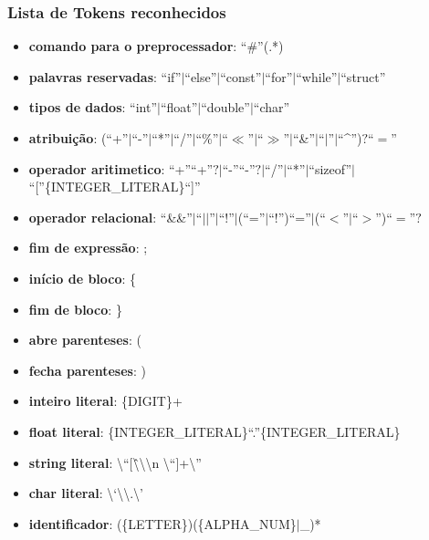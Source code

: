 \documentclass[12pt]{beamer}
\begin{document}
\begin{frame}[allowframebreaks]
    \frametitle{Lista de Tokens reconhecidos}
    \begin{itemize}
        \item\textbf{comando para o preprocessador}: ``\#''(.*)
        \item\textbf{palavras reservadas}: ``if''$|$``else''$|$``const''$|$``for''$|$``while''$|$``struct''
        \item\textbf{tipos de dados}: ``int''$|$``float''$|$``double''$|$``char''
        \item\textbf{atribuição}: (``+''$|$``-''$|$``*''$|$``/''$|$``\%''$|$``$\ll$''$|$``$\gg$''$|$``\&''$|$``$|$''$|$``^'')$?$``$=$''
        \item\textbf{operador aritimetico}: ``+''``+''$?|$``-''``-''$?|$``/''$|$``*''$|$``sizeof''$|$``[''\{INTEGER\_LITERAL\}``]''
        \item\textbf{operador relacional}: ``\&\&''$|$``$||$''$|$``!''$|$(``=''$|$``!'')``=''$|$(``$<$''$|$``$>$'')``$=$''$?$
        \item\textbf{fim de expressão}: ;
        \item\textbf{início de bloco}: \{
        \item\textbf{fim de bloco}: \}
        \item\textbf{abre parenteses}: (
        \item\textbf{fecha parenteses}: )
        \item\textbf{inteiro literal}: \{DIGIT\}+
        \item\textbf{float literal}: \{INTEGER\_LITERAL\}``.''\{INTEGER\_LITERAL\}
        \item\textbf{string literal}: \backslash``[\^ \backslash\backslash\backslash n \backslash``]+\backslash''
        \item\textbf{char literal}: \backslash `\backslash \backslash \?.\backslash'
        \item\textbf{identificador}: (\{LETTER\})(\{ALPHA\_NUM\}$|$\_)*
    \end{itemize}
\end{frame}
\end{document}
